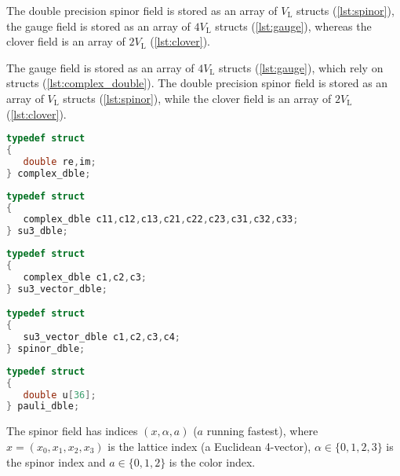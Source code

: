 The double precision spinor field is stored as an array of $V_\mathrm{L}$  structs (\cref{lst:spinor}), the gauge field is stored as an array of $4V_\mathrm{L}$  structs (\cref{lst:gauge}), whereas the clover field is an array of $2V_\mathrm{L}$  (\cref{lst:clover}).

The gauge field is stored as an array of $4V_\mathrm{L}$  structs (\cref{lst:gauge}), which rely on  structs (\cref{lst:complex_double}). The double precision spinor field is stored as an array of $V_\mathrm{L}$  structs (\cref{lst:spinor}), while the clover field is an array of $2V_\mathrm{L}$  (\cref{lst:clover}). 

\begin{lstlisting}[language=C++, caption=The  complex double struct, label=lst:complex_double]
typedef struct
{
   double re,im;
} complex_dble;
\end{lstlisting}

\noindent
\begin{minipage}{\linewidth}
\begin{lstlisting}[language=C++, caption=The gauge field struct, label=lst:gauge]
typedef struct
{
   complex_dble c11,c12,c13,c21,c22,c23,c31,c32,c33;
} su3_dble;
\end{lstlisting}
\end{minipage}

\begin{lstlisting}[language=C++, caption=The spinor field struct, label=lst:spinor]
typedef struct
{
   complex_dble c1,c2,c3;
} su3_vector_dble;

typedef struct
{
   su3_vector_dble c1,c2,c3,c4;
} spinor_dble;
\end{lstlisting}



\begin{lstlisting}[language=C++, caption=The clover field struct, label=lst:clover]
typedef struct
{
   double u[36];
} pauli_dble;
\end{lstlisting}

The spinor field has indices $(x, \alpha, a)$ ($a$ running fastest), where $x=(x_0,x_1,x_2,x_3)$ is the lattice index (a Euclidean 4-vector), $\alpha \in \{0,1,2,3\}$ is the spinor index and $a \in \{0,1,2\}$ is the color index.

